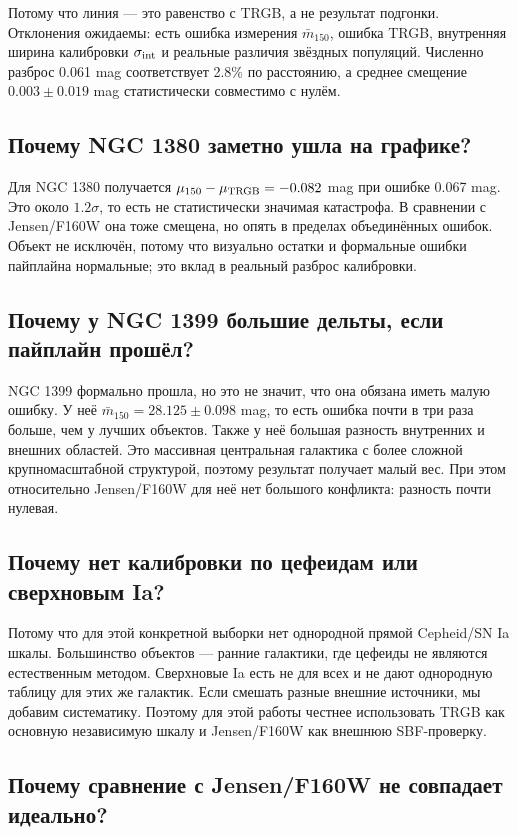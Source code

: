 \documentclass[12pt]{article}
\begin{document}
Потому что линия --- это равенство с TRGB, а не результат подгонки. Отклонения ожидаемы: есть ошибка измерения $\bar{m}_{150}$, ошибка TRGB, внутренняя ширина калибровки $\sigma_{\rm int}$ и реальные различия звёздных популяций. Численно разброс 0.061 mag соответствует 2.8\% по расстоянию, а среднее смещение $0.003\pm0.019$ mag статистически совместимо с нулём.

\subsection*{Почему NGC 1380 заметно ушла на графике?}

Для NGC 1380 получается $\mu_{150}-\mu_{\rm TRGB}=-0.082$ mag при ошибке 0.067 mag. Это около $1.2\sigma$, то есть не статистически значимая катастрофа. В сравнении с Jensen/F160W она тоже смещена, но опять в пределах объединённых ошибок. Объект не исключён, потому что визуально остатки и формальные ошибки пайплайна нормальные; это вклад в реальный разброс калибровки.

\subsection*{Почему у NGC 1399 большие дельты, если пайплайн прошёл?}

NGC 1399 формально прошла, но это не значит, что она обязана иметь малую ошибку. У неё $\bar{m}_{150}=28.125\pm0.098$ mag, то есть ошибка почти в три раза больше, чем у лучших объектов. Также у неё большая разность внутренних и внешних областей. Это массивная центральная галактика с более сложной крупномасштабной структурой, поэтому результат получает малый вес. При этом относительно Jensen/F160W для неё нет большого конфликта: разность почти нулевая.

\subsection*{Почему нет калибровки по цефеидам или сверхновым Ia?}

Потому что для этой конкретной выборки нет однородной прямой Cepheid/SN Ia шкалы. Большинство объектов --- ранние галактики, где цефеиды не являются естественным методом. Сверхновые Ia есть не для всех и не дают однородную таблицу для этих же галактик. Если смешать разные внешние источники, мы добавим систематику. Поэтому для этой работы честнее использовать TRGB как основную независимую шкалу и Jensen/F160W как внешнюю SBF-проверку.

\subsection*{Почему сравнение с Jensen/F160W не совпадает идеально?}
\end{document}
